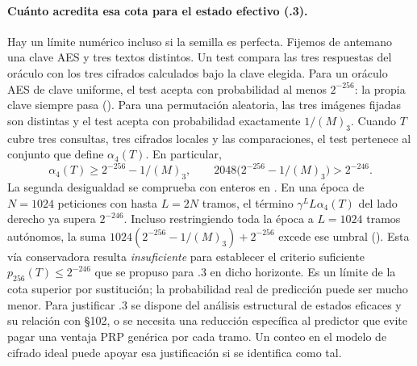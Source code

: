 \paragraph{Cuánto acredita esa cota para el estado efectivo (.3).}
Hay un límite numérico incluso si la semilla es perfecta. Fijemos de antemano
una clave AES y tres textos distintos. Un test compara las tres respuestas del
oráculo con los tres cifrados calculados bajo la clave elegida. Para un oráculo
AES de clave uniforme, el test acepta con probabilidad al menos \(2^{-256}\):
la propia clave siempre pasa ().
Para una permutación aleatoria, las tres imágenes fijadas son distintas y el
test acepta con probabilidad exactamente \(1/(M)_3\). Cuando \(T\) cubre
tres consultas, tres cifrados locales y las comparaciones, el test pertenece al
conjunto que define \(\alpha_4(T)\). En particular,
\[
 \alpha_4(T)\ge 2^{-256}-1/(M)_3,\qquad
 2048\bigl(2^{-256}-1/(M)_3\bigr)>2^{-246}.
\]
La segunda desigualdad se comprueba con enteros en
. En una época de \(N=1024\) peticiones
con hasta \(L=2N\) tramos, el término \(\gamma^L L\alpha_4(T)\) del lado
derecho ya supera \(2^{-246}\). Incluso restringiendo toda la época a
\(L=1024\) tramos autónomos, la suma
\(1024(2^{-256}-1/(M)_3)+2^{-256}\) excede ese umbral
(). Esta vía conservadora resulta
\emph{insuficiente} para establecer el criterio suficiente
\(p_{256}(T)\le2^{-246}\) que se propuso para .3 en dicho horizonte.
Es un límite de la cota superior por sustitución; la probabilidad real de
predicción puede ser mucho menor. Para justificar .3 se dispone del análisis
estructural de estados eficaces y su relación con §102, o se necesita una
reducción específica al predictor que evite pagar una ventaja PRP genérica
por cada tramo. Un conteo en el modelo de cifrado ideal puede apoyar esa
justificación si se identifica como tal.

